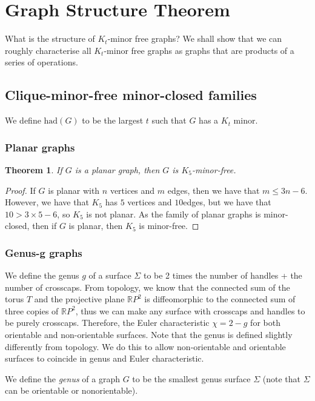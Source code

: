 \documentclass[]{article}
\newcommand{\had}{\text{had}}
\newtheorem{theorem}{Theorem}
\theoremstyle{definition}
\numberwithin{theorem}{section}
\numberwithin{equation}{section}
\begin{document}
\section{Graph Structure Theorem}\label{sec:Kt_Minor_Free}
What is the structure of $K_t$-minor free graphs? We shall show that we can roughly characterise all $K_t$-minor free graphs as graphs that are products of a series of operations. 
\subsection{Clique-minor-free minor-closed families}\label{ssec:Kt_Minor_Closed_families}
We define $\had(G)$ to be the largest $t$ such that $G$ has a $K_t$ minor. 
\subsubsection{Planar graphs}\label{sssec:K_5-free_Planar}
\begin{theorem}\label{thm:K5_Free_Planar}
	If $G$ is a planar graph, then $G$ is $K_5$-minor-free.
\end{theorem}
\begin{proof}
	If $G$ is planar with $n$ vertices and $m$ edges, then we have that $m \leq 3n -6$. However, we have that $K_5$ has $5$ vertices and $10$edges, but we have that $ 10 > 3 \times 5 - 6$, so $K_5$ is not planar. As the family of planar graphs is minor-closed, then if $G$ is planar, then $K_5$ is minor-free.
\end{proof}

\subsubsection{Genus-g graphs}\label{sssec:Graph_genus}
We define the genus $g$ of a surface $\Sigma$ to be 2 times the number of handles + the number of crosscaps. From topology, we know that the connected sum of the torus $T$ and the projective plane $\mathbb{R}P^2$ is diffeomorphic to the connected sum of three copies of $\mathbb{R}P^2$, thus we can make any surface with crosscaps and handles to be purely crosscaps. Therefore, the Euler characteristic $\chi = 2 - g$ for both orientable and non-orientable surfaces. Note that the genus is defined slightly differently from topology. We do this to allow non-orientable and orientable surfaces to coincide in genus and Euler characteristic.

We define the \textit{genus} of a graph $G$ to be the smallest genus surface $\Sigma$ (note that $\Sigma$ can be orientable or nonorientable). 
\end{document}
